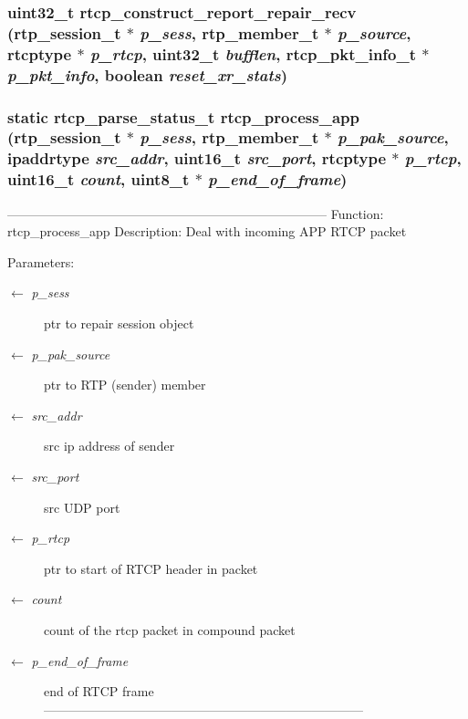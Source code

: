 \subsubsection{\setlength{\rightskip}{0pt plus 5cm}uint32\_\-t rtcp\_\-construct\_\-report\_\-repair\_\-recv (rtp\_\-session\_\-t $\ast$ {\em p\_\-sess}, rtp\_\-member\_\-t $\ast$ {\em p\_\-source}, rtcptype $\ast$ {\em p\_\-rtcp}, uint32\_\-t {\em bufflen}, rtcp\_\-pkt\_\-info\_\-t $\ast$ {\em p\_\-pkt\_\-info}, boolean {\em reset\_\-xr\_\-stats})}\label{rtp__repair__recv_8c_4a35775b17d59b406634fee753d7eee4}


\subsubsection{\setlength{\rightskip}{0pt plus 5cm}static rtcp\_\-parse\_\-status\_\-t rtcp\_\-process\_\-app (rtp\_\-session\_\-t $\ast$ {\em p\_\-sess}, rtp\_\-member\_\-t $\ast$ {\em p\_\-pak\_\-source}, ipaddrtype {\em src\_\-addr}, uint16\_\-t {\em src\_\-port}, rtcptype $\ast$ {\em p\_\-rtcp}, uint16\_\-t {\em count}, uint8\_\-t $\ast$ {\em p\_\-end\_\-of\_\-frame})\hspace{0.3cm}{\tt  [static]}}\label{rtp__repair__recv_8c_72b67dccf4038f6d7697ea556a09c15c}


--------------------------------------------------------------------------- Function: rtcp\_\-process\_\-app Description: Deal with incoming APP RTCP packet \begin{Desc}
\item[Parameters:]
\begin{description}
\item[\mbox{$\leftarrow$} {\em p\_\-sess}]ptr to repair session object \item[\mbox{$\leftarrow$} {\em p\_\-pak\_\-source}]ptr to RTP (sender) member \item[\mbox{$\leftarrow$} {\em src\_\-addr}]src ip address of sender \item[\mbox{$\leftarrow$} {\em src\_\-port}]src UDP port \item[\mbox{$\leftarrow$} {\em p\_\-rtcp}]ptr to start of RTCP header in packet \item[\mbox{$\leftarrow$} {\em count}]count of the rtcp packet in compound packet \item[\mbox{$\leftarrow$} {\em p\_\-end\_\-of\_\-frame}]end of RTCP frame --------------------------------------------------------------------------- \end{description}
\end{Desc}
